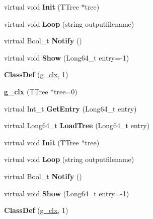 \begin{DoxyCompactItemize}
virtual void {\bfseries Init} (T\+Tree $\ast$tree)
\item 
\mbox{\label{classg__clx_aeb5d4743fbc3fa60d189ed91e4c6e246}} 
virtual void {\bfseries Loop} (string outputfilename)
\item 
\mbox{\label{classg__clx_a1fe81316168bc18dc2325ca5595577a9}} 
virtual Bool\+\_\+t {\bfseries Notify} ()
\item 
\mbox{\label{classg__clx_ae86183470c7bb8db45753aa4c86f1d41}} 
virtual void {\bfseries Show} (Long64\+\_\+t entry=-\/1)
\item 
\mbox{\label{classg__clx_a8d0a8ed3a7cc55ca97aeb77f4183d3b8}} 
{\bfseries Class\+Def} (\hyperlink{classg__clx}{g\+\_\+clx}, 1)
\item 
\mbox{\label{classg__clx_aa619daf508fe1d6bddb000af26630f31}} 
{\bfseries g\+\_\+clx} (T\+Tree $\ast$tree=0)
\item 
\mbox{\label{classg__clx_ab4c53e12e70c3671ff8895fc388dd7d2}} 
virtual Int\+\_\+t {\bfseries Get\+Entry} (Long64\+\_\+t entry)
\item 
\mbox{\label{classg__clx_a0aab3745bdb3db08757c974eebffbe39}} 
virtual Long64\+\_\+t {\bfseries Load\+Tree} (Long64\+\_\+t entry)
\item 
\mbox{\label{classg__clx_a92531261155ea15bee6b74c7e491132a}} 
virtual void {\bfseries Init} (T\+Tree $\ast$tree)
\item 
\mbox{\label{classg__clx_aeb5d4743fbc3fa60d189ed91e4c6e246}} 
virtual void {\bfseries Loop} (string outputfilename)
\item 
\mbox{\label{classg__clx_a1fe81316168bc18dc2325ca5595577a9}} 
virtual Bool\+\_\+t {\bfseries Notify} ()
\item 
\mbox{\label{classg__clx_ae86183470c7bb8db45753aa4c86f1d41}} 
virtual void {\bfseries Show} (Long64\+\_\+t entry=-\/1)
\item 
\mbox{\label{classg__clx_a8d0a8ed3a7cc55ca97aeb77f4183d3b8}} 
{\bfseries Class\+Def} (\hyperlink{classg__clx}{g\+\_\+clx}, 1)
\end{DoxyCompactItemize}
